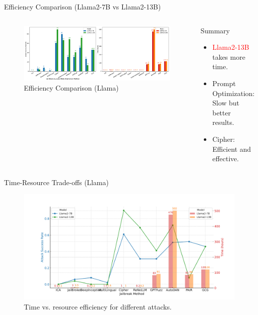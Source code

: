 \documentclass{beamer}
\begin{document}
\begin{frame}{Efficiency Comparison (Llama2-7B vs Llama2-13B)}
    \begin{columns}
        \begin{figure}[ht]
            \centering
            \includegraphics[width=\linewidth]{pic/comparison_plot_2.pdf}
            \caption{Efficiency Comparison (Llama)}
            \label{fig:asr_plot_2}
        \end{figure}
        \pause
            \begin{block}{Summary}
            \begin{itemize}
                \item \textcolor{red}{Llama2-13B} takes more time.\pause
                \item Prompt Optimization: Slow but better results.\pause
                \item Cipher: Efficient and effective.
            \end{itemize}
        \end{block}
            
    \end{columns}
\end{frame}

\begin{frame}{Time-Resource Trade-offs (Llama)}
    \begin{figure}[h]
        \centering
        \includegraphics[width=\textwidth]{pic/accuracy_and_time_consumption_chart.pdf}
        \caption{Time vs. resource efficiency for different attacks.}
        \label{fig:time_res_trade}
    \end{figure}
\end{frame}
\end{document}
